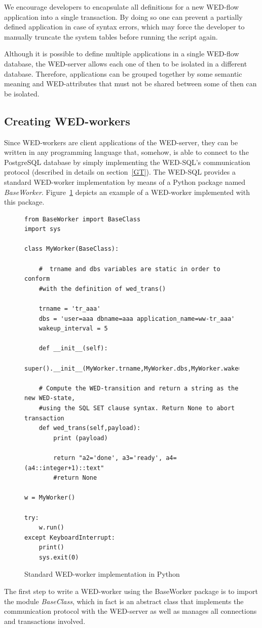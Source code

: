 \documentclass[conference]{IEEEtran}
\begin{document}
\par We encourage developers to encapsulate all definitions for a new WED-flow application into a single transaction. By doing
so one can prevent a partially defined application in case of syntax errors, which may force the developer to manually truncate
the system tables before running the script again. 

\par Although it is possible to define multiple applications in a single WED-flow database, the WED-server allows each one of
then to be isolated in a different database. Therefore, applications can be grouped together by some semantic meaning and WED-attributes
that must not be shared between some of then can be isolated. 

\subsection{Creating WED-workers}

Since WED-workers are client applications of the WED-server, they can be written in any programming language that, somehow,
is able to connect to the PostgreSQL database by simply implementing the WED-SQL's communication protocol (described in
details on section~\ref{GT}). The WED-SQL provides a standard WED-worker implementation by means of a Python package named
\emph{BaseWorker}. Figure~\ref{fig_ww} depicts an example of a WED-worker implemented with this package.

\begin{figure}[!t]
\begin{Verbatim}[fontsize=\tiny]
from BaseWorker import BaseClass
import sys

class MyWorker(BaseClass):
    
    #  trname and dbs variables are static in order to conform 
    #with the definition of wed_trans()
        
    trname = 'tr_aaa'
    dbs = 'user=aaa dbname=aaa application_name=ww-tr_aaa'
    wakeup_interval = 5
    
    def __init__(self):
        super().__init__(MyWorker.trname,MyWorker.dbs,MyWorker.wakeup_interval)
    
    # Compute the WED-transition and return a string as the new WED-state, 
    #using the SQL SET clause syntax. Return None to abort transaction
    def wed_trans(self,payload):
        print (payload)
        
        return "a2='done', a3='ready', a4=(a4::integer+1)::text"
        #return None
        
w = MyWorker()

try:
    w.run()
except KeyboardInterrupt:
    print()
    sys.exit(0)
\end{Verbatim}
\caption{Standard WED-worker implementation in Python}
\label{fig_ww}
\end{figure}
The first step to write a WED-worker using the BaseWorker package is to import the module \emph{BaseClass}, which in fact
is an abstract class that implements the communication protocol with the WED-server as well as manages all connections
and transactions involved.  
\end{document}
